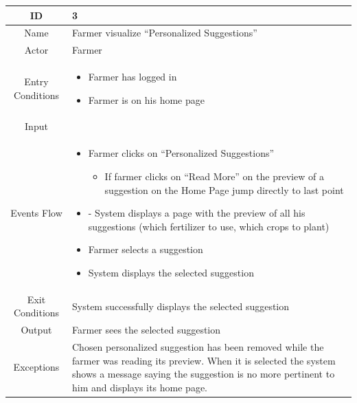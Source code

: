 \documentclass{article}
\begin{document}
\begin{center}
    \newpage
    
    
    
    
    \begin{longtable}{|c| p{10cm}|}
        \hline
            ID & 3 \\
        \hline
            Name & Farmer visualize “Personalized Suggestions” \\
        \hline
            Actor & Farmer \\
        \hline
            Entry Conditions & 
                                \begin{itemize}
                                    \item Farmer has logged in
                                    \item Farmer is on his home page
                                \end{itemize}\\
        \hline
            Input & \\
        \hline
            Events Flow & 
                    \begin{itemize}
                        \item Farmer clicks on “Personalized Suggestions” 
                            \begin{itemize}
                                \item If farmer clicks on “Read More” on the preview of a suggestion on the Home Page jump directly to last point
                            \end{itemize} 
                        \item -	System displays a page with the preview of all his suggestions (which fertilizer to use, which crops to plant) 
                        \item Farmer selects a suggestion
                        \item System displays the selected suggestion
                    \end{itemize}\\
        \hline
        Exit Conditions & System successfully displays the selected suggestion\\
        \hline
            Output & Farmer sees the selected suggestion\\
        \hline
            Exceptions & Chosen personalized suggestion has been removed while the farmer was reading its preview. When it is selected the system shows a message saying the suggestion is no more pertinent to him and displays its home page.\\
        \hline
    \end{longtable}
   

\end{center}
\end{document}
